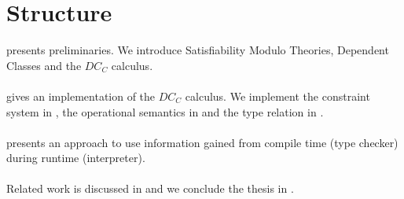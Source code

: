 \section{Structure}
 presents preliminaries.
We introduce Satisfiability Modulo Theories,
Dependent Classes and the $DC_C$ calculus.\\
\\
 gives an implementation of the $DC_C$ calculus.
We implement
the constraint system in ,
the operational semantics in  and
the type relation in .\\
\\
 presents an approach
to use information gained from compile time (type checker)
during runtime (interpreter).\\
\\
Related work is discussed in 
and we conclude the thesis in .

